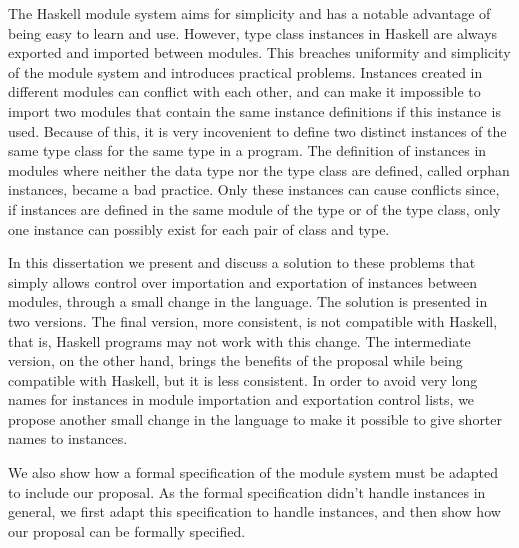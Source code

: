 The Haskell module system aims for simplicity and has a notable
advantage of being easy to learn and use. However, type class
instances in Haskell are always exported and imported between
modules. This breaches uniformity and simplicity of the module system
and introduces practical problems.  Instances created in different modules can
conflict with each other, and can make it impossible to import two
modules that contain the same instance definitions if this instance is used.  Because of
this, it is very incovenient to define two distinct instances of the same type class
for the same type in a program.  The
definition of instances in modules where neither the data type nor the type class are
defined, called orphan instances, became a bad practice.  Only
these instances can cause conflicts since, if instances are
defined in the same module of the type or of the type class, only
one instance can possibly exist for each pair of class and type.

In this dissertation we present and discuss a solution to these problems that
simply allows control over importation and exportation of instances between
modules, through a small change in the language.  The solution is
presented in two versions.  The final version, more consistent, is not
compatible with Haskell, that is, Haskell programs may not work
with this change.  The intermediate version, on the other hand, brings the
benefits of the proposal while being compatible with Haskell, but it is
less consistent.  In order to avoid very long
names for instances in module importation and exportation control lists, we propose another small change in the language to make it possible
to give shorter names to instances.

We also show how a formal specification of the module system must be
adapted to include our proposal.  As the formal specification didn't
handle instances in general, we first adapt this specification to handle instances, and then show how our proposal can be formally specified.

